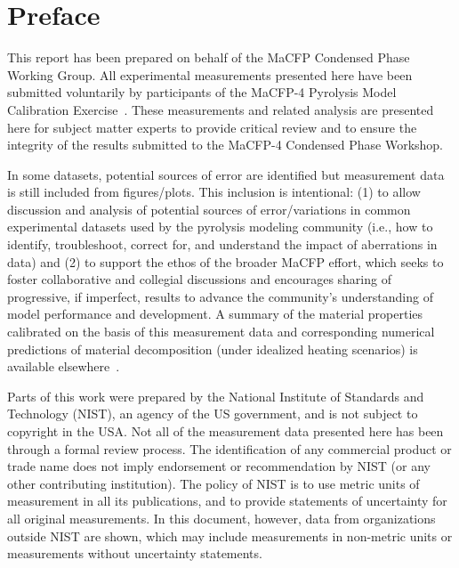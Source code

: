 \documentclass{book}
\begin{document}
	\newpage
	\thispagestyle{empty}
	
	\frontmatter
	
	\chapter{Preface}
	\thispagestyle{fancy}
	This report has been prepared on behalf of the MaCFP Condensed Phase Working Group. All experimental measurements presented here have been submitted voluntarily by participants of the MaCFP-4 Pyrolysis Model Calibration Exercise~\cite{MaCFP4Guidelines}. These measurements and related analysis are presented here for subject matter experts to provide critical review and to ensure the integrity of the results submitted to the MaCFP-4 Condensed Phase Workshop.
	
	In some datasets, potential sources of error are identified but measurement data is still included from figures/plots. This inclusion is intentional: (1) to allow discussion and analysis of potential sources of error/variations in common experimental datasets used by the pyrolysis modeling community (i.e., how to identify, troubleshoot, correct for, and understand the impact of aberrations in data) and (2) to support the ethos of the broader MaCFP effort, which seeks to foster collaborative and collegial discussions and encourages sharing of progressive, if imperfect, results to advance the community’s understanding of model performance and development. A summary of the material properties calibrated on the basis of this measurement data and corresponding numerical predictions of material decomposition (under idealized heating scenarios) is available elsewhere~\cite{MaCFP4PyrolysisModel}.


Parts of this work were prepared by the National Institute of Standards and Technology (NIST), an agency of the US government, and is not subject to copyright in the USA. Not all of the measurement data presented here has been through a formal review process. The identification of any commercial product or trade name does not imply endorsement or recommendation by NIST (or any other contributing institution). The policy of NIST is to use metric units of measurement in all its publications, and to provide statements of uncertainty for all original measurements. In this document, however, data from organizations outside NIST are shown, which may include measurements in non-metric units or measurements without uncertainty statements.
\end{document}
